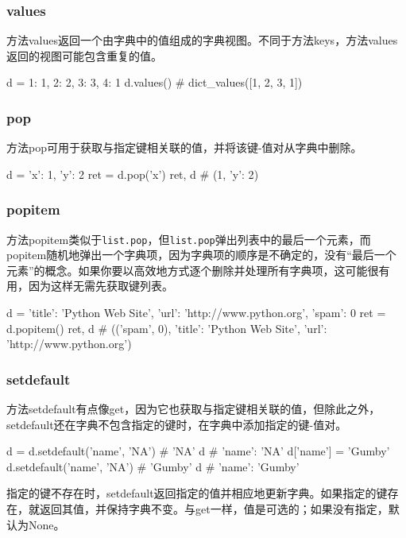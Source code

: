 \subsubsection{values}
方法values返回一个由字典中的值组成的字典视图。不同于方法keys，方法values返回的视图可能包含重复的值。
\begin{pyc}
d = {1: 1, 2: 2, 3: 3, 4: 1}
d.values()
# dict_values([1, 2, 3, 1])
\end{pyc}
\subsubsection{pop}
方法pop可用于获取与指定键相关联的值，并将该键-值对从字典中删除。
\begin{pyc}
d = {'x': 1, 'y': 2}
ret = d.pop('x')
ret, d  # (1, {'y': 2})
\end{pyc}
\subsubsection{popitem}
方法popitem类似于\verb|list.pop|，但\verb|list.pop|弹出列表中的最后一个元素，而popitem随机地弹出一个字典项，因为字典项的顺序是不确定的，没有“最后一个元素”的概念。如果你要以高效地方式逐个删除并处理所有字典项，这可能很有用，因为这样无需先获取键列表。
\begin{pyc}
d = {'title': 'Python Web Site', 'url': 'http://www.python.org', 'spam': 0}
ret = d.popitem()
ret, d
# (('spam', 0), {'title': 'Python Web Site', 'url': 'http://www.python.org'})
\end{pyc}


\subsubsection{setdefault\label{setdefault}}
方法setdefault有点像get，因为它也获取与指定键相关联的值，但除此之外，setdefault还在字典不包含指定的键时，在字典中添加指定的键-值对。
\begin{pyc}
d = {}
d.setdefault('name', 'NA')  # 'NA'
d  # {'name': 'NA'}
d['name'] = 'Gumby'
d.setdefault('name', 'NA')  # 'Gumby'
d  # {'name': 'Gumby'}
\end{pyc}
指定的键不存在时，setdefault返回指定的值并相应地更新字典。如果指定的键存在，就返回其值，并保持字典不变。与get一样，值是可选的；如果没有指定，默认为None。

